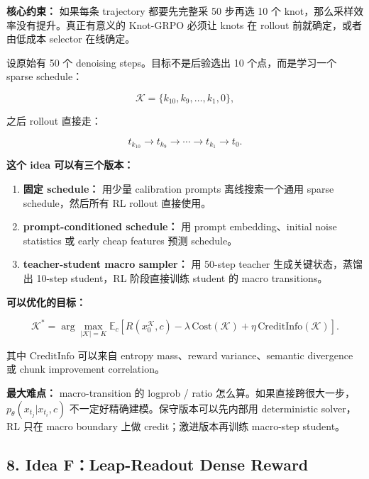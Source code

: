 \begin{conceptbox}
\textbf{核心约束：} 如果每条 trajectory 都要先完整采 50 步再选 10 个 knot，那么采样效率没有提升。真正有意义的 Knot-GRPO 必须让 knots 在 rollout 前就确定，或者由低成本 selector 在线确定。
\end{conceptbox}

设原始有 50 个 denoising steps。目标不是后验选出 10 个点，而是学习一个 sparse schedule：

\[
\mathcal{K}=\{k_{10},k_9,\ldots,k_1,0\},
\]

之后 rollout 直接走：

\[
t_{k_{10}}\rightarrow t_{k_9}\rightarrow\cdots\rightarrow t_{k_1}\rightarrow t_0.
\]

\textbf{这个 idea 可以有三个版本：}

\begin{enumerate}[leftmargin=1.5em]
  \item \textbf{固定 schedule：} 用少量 calibration prompts 离线搜索一个通用 sparse schedule，然后所有 RL rollout 直接使用。
  \item \textbf{prompt-conditioned schedule：} 用 prompt embedding、initial noise statistics 或 early cheap features 预测 schedule。
  \item \textbf{teacher-student macro sampler：} 用 50-step teacher 生成关键状态，蒸馏出 10-step student，RL 阶段直接训练 student 的 macro transitions。
\end{enumerate}

\textbf{可以优化的目标：}

\[
\mathcal{K}^{*}
=
\arg\max_{|\mathcal{K}|=K}
\mathbb{E}_{c}
\left[
R(x^{\mathcal{K}}_0,c)
-\lambda\,\mathrm{Cost}(\mathcal{K})
+\eta\,\mathrm{CreditInfo}(\mathcal{K})
\right].
\]

其中 \(\mathrm{CreditInfo}\) 可以来自 entropy mass、reward variance、semantic divergence 或 chunk improvement correlation。

\begin{warnbox}
\textbf{最大难点：} macro-transition 的 logprob / ratio 怎么算。如果直接跨很大一步，\(p_{\theta}(x_{t_j}|x_{t_i},c)\) 不一定好精确建模。保守版本可以先内部用 deterministic solver，RL 只在 macro boundary 上做 credit；激进版本再训练 macro-step student。
\end{warnbox}

\subsection{8. Idea F：Leap-Readout Dense Reward}

